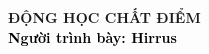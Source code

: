 \begin{frame}[noframenumbering]
    \thispagestyle{empty}
    \bfseries
    \begin{flushleft}
        \vfill
        \vspace{5mm}
        \textcolor{BlueDefault}{\huge \bfseries ĐỘNG HỌC CHẤT ĐIỂM} \\
        \vspace{10mm}
        \textcolor{black}{\large \bfseries Người trình bày: Hirrus}
        \vfill
    \end{flushleft}
\end{frame}